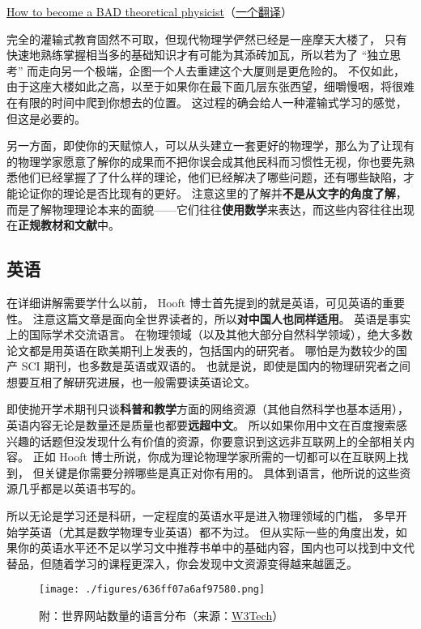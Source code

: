 \href{https://webspace.science.uu.nl/~hooft101/theoristbad.html#:~:text=On\%20your\%20way\%20towards\%20becoming,have\%20your\%20work\%20published\%20anyway.}{How to become a BAD theoretical physicist}（\href{https://zhuanlan.zhihu.com/p/38680467}{一个翻译}）

完全的灌输式教育固然不可取，但现代物理学俨然已经是一座摩天大楼了， 只有快速地熟练掌握相当多的基础知识才有可能为其添砖加瓦，所以若为了 “独立思考” 而走向另一个极端，企图一个人去重建这个大厦则是更危险的。 不仅如此，由于这座大楼如此之高，以至于如果你在最下面几层东张西望，细嚼慢咽，将很难在有限的时间中爬到你想去的位置。 这过程的确会给人一种灌输式学习的感觉，但这是必要的。

另一方面，即使你的天赋惊人，可以从头建立一套更好的物理学，那么为了让现有的物理学家愿意了解你的成果而不把你误会成其他民科而习惯性无视，你也要先熟悉他们已经掌握了了什么样的理论，他们已经解决了哪些问题，还有哪些缺陷，才能论证你的理论是否比现有的更好。 注意这里的了解并\textbf{不是从文字的角度了解}，而是了解物理理论本来的面貌——它们往往\textbf{使用数学}来表达，而这些内容往往出现在\textbf{正规教材和文献}中。

\subsection{英语}
在详细讲解需要学什么以前， Hooft 博士首先提到的就是英语，可见英语的重要性。 注意这篇文章是面向全世界读者的，所以\textbf{对中国人也同样适用}。 英语是事实上的国际学术交流语言。 在物理领域（以及其他大部分自然科学领域），绝大多数论文都是用英语在欧美期刊上发表的，包括国内的研究者。 哪怕是为数较少的国产 SCI 期刊，也多数是英语或双语的。 也就是说，即使是国内的物理研究者之间想要互相了解研究进展，也一般需要读英语论文。

即使抛开学术期刊只谈\textbf{科普和教学}方面的网络资源（其他自然科学也基本适用），英语内容无论是数量还是质量也都要\textbf{远超中文}。 所以如果你用中文在百度搜索感兴趣的话题但没发现什么有价值的资源，你要意识到这远非互联网上的全部相关内容。 正如 Hooft 博士所说，你成为理论物理学家所需的一切都可以在互联网上找到， 但关键是你需要分辨哪些是真正对你有用的。 具体到语言，他所说的这些资源几乎都是以英语书写的。

所以无论是学习还是科研，一定程度的英语水平是进入物理领域的门槛， 多早开始学英语（尤其是数学物理专业英语）都不为过。 但从实际一些的角度出发，如果你的英语水平还不足以学习文中推荐书单中的基础内容，国内也可以找到中文代替品，但随着学习的课程更深入，你会发现中文资源变得越来越匮乏。

\begin{figure}[ht]
\centering
\texttt{[image: ./figures/636ff07a6af97580.png]}
\caption{附：世界网站数量的语言分布（来源：\href{https://w3techs.com/technologies/overview/content_language}{W3Tech}）} \label{fig_SdyPhy_2}
\end{figure}

